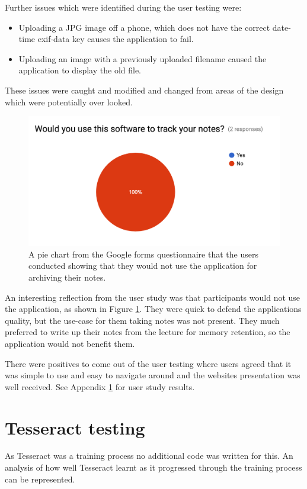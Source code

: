 Further issues which were identified during the user testing were:
\begin{itemize}
  \item Uploading a JPG image off a phone, which does not have the correct date-time exif-data key causes the application to fail.
  \item Uploading an image with a previously uploaded filename caused the application to display the old file.
\end{itemize}

These issues were caught and modified and changed from areas of the design which were potentially over looked.

\begin{figure}[h!]
  \centering
  \includegraphics[scale=0.5]{images/user_response}
  \caption{A pie chart from the Google forms questionnaire \cite{citeulike:14025272} that the users conducted showing that they would not use the application for archiving their notes.}
  \label{fig:user_response}
\end{figure}

An interesting reflection from the user study was that participants would not use the application, as shown in Figure \ref{fig:user_response}. They were quick to defend the applications quality, but the use-case for them taking notes was not present. They much preferred to write up their notes from the lecture for memory retention, so the application would not benefit them.

There were positives to come out of the user testing where users agreed that it was simple to use and easy to navigate around and the websites presentation was well received. See Appendix \ref{} for user study results.

\section{Tesseract testing}
As Tesseract was a training process no additional code was written for this. An analysis of how well Tesseract learnt as it progressed through the training process can be represented.

